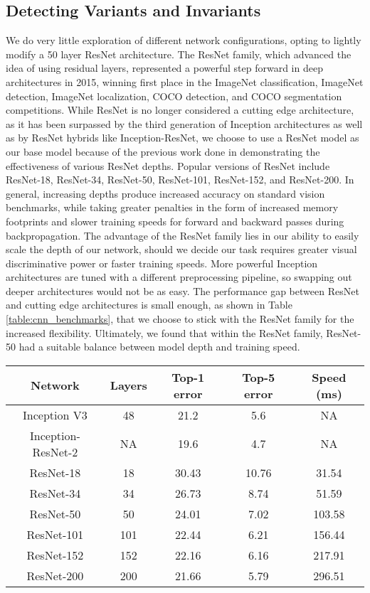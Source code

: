 \subsection{Detecting Variants and Invariants}

We do very little exploration of different network configurations, opting to lightly modify a 50 layer ResNet architecture. The ResNet family, which advanced the idea of using residual layers, represented a powerful step forward in deep architectures in 2015, winning first place in the ImageNet classification, ImageNet detection, ImageNet localization, COCO detection, and COCO segmentation competitions.\cite{He2015} While ResNet is no longer considered a cutting edge architecture, as it has been surpassed by the third generation of Inception architectures as well as by ResNet hybrids like Inception-ResNet, we choose to use a ResNet model as our base model because of the previous work done in demonstrating the effectiveness of various ResNet depths.\cite{He2015}\cite{szegedy2016inception} Popular versions of ResNet include ResNet-18, ResNet-34, ResNet-50, ResNet-101, ResNet-152, and ResNet-200. In general, increasing depths produce increased accuracy on standard vision benchmarks, while taking greater penalties in the form of increased memory footprints and slower training speeds for forward and backward passes during backpropagation. The advantage of the ResNet family lies in our ability to easily scale the depth of our network, should we decide our task requires greater visual discriminative power or faster training speeds. More powerful Inception architectures are tuned with a different preprocessing pipeline, so swapping out deeper architectures would not be as easy. The performance gap between ResNet and cutting edge architectures is small enough, as shown in Table \ref{table:cnn_benchmarks}, that we choose to stick with the ResNet family for the increased flexibility. Ultimately, we found that within the ResNet family, ResNet-50 had a suitable balance between model depth and training speed.

\begin{center}
 \begin{tabular}{||c c c c c||} 
 \hline
 Network & Layers & Top-1 error & Top-5 error & Speed (ms) \\ [0.5ex] 
 \hline\hline
 Inception V3 & 48 & 21.2 & 5.6 & NA \\ 
 \hline
 Inception-ResNet-2 & NA & 19.6 & 4.7 & NA \\ 
 \hline
 ResNet-18 & 18 & 30.43 & 10.76 & 31.54 \\ 
 \hline
 ResNet-34 & 34 & 26.73 & 8.74 & 51.59 \\ 
 \hline
  ResNet-50 & 50 & 24.01 & 7.02 & 103.58 \\ 
 \hline
  ResNet-101 & 101 & 22.44 & 6.21 & 156.44 \\ 
 \hline
  ResNet-152 & 152 & 22.16 & 6.16 & 217.91 \\ 
 \hline
  ResNet-200 & 200 & 21.66 & 5.79 & 296.51 \\[1ex] 
 \hline
\end{tabular}
\label{table:cnn_benchmarks}
\end{center}

